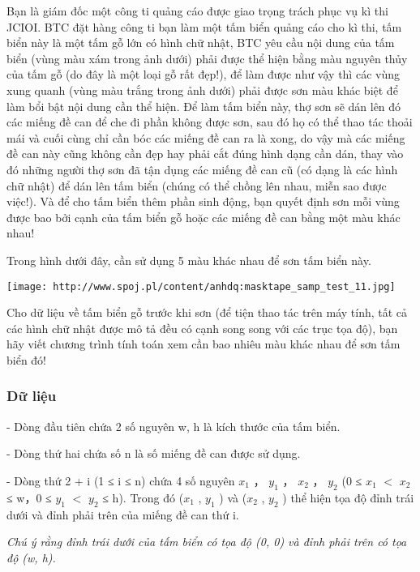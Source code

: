 



   Bạn là giám đốc một công ti quảng cáo được giao trọng trách phục vụ kì thi JCIOI. BTC đặt hàng công ti bạn làm một tấm biển quảng cáo cho kì thi, tấm biển này là một tấm gỗ lớn có hình chữ nhật, BTC yêu cầu nội dung của tấm biển (vùng màu xám trong ảnh dưới) phải được thể hiện bằng màu nguyên thủy của tấm gỗ (do đây là một loại gỗ rất đẹp!), để làm được như vậy thì các vùng xung quanh (vùng màu trắng trong ảnh dưới) phải được sơn màu khác biệt để làm bổi bật nội dung cần thể hiện. Để làm tấm biển này, thợ sơn sẽ dán lên đó các miếng đề can để che đi phần không được sơn, sau đó họ có thể thao tác thoải mái và cuối cùng chỉ cần bóc các miếng đề can ra là xong, do vậy mà các miếng đề can này cũng không cần đẹp hay phải cắt đúng hình dạng cần dán, thay vào đó những người thợ sơn đã tận dụng các miếng đề can cũ (có dạng là các hình chữ nhật) để dán lên tấm biển (chúng có thể chồng lên nhau, miễn sao được việc!). Và để cho tấm biển thêm phần sinh động, bạn quyết định sơn mỗi vùng được bao bởi cạnh của tấm biển gỗ hoặc các miếng đề can bằng một màu khác nhau!   


   Trong hình dưới đây, cần sử dụng 5 màu khác nhau để sơn tấm biển này.  


\texttt{[image: http://www.spoj.pl/content/anhdq:masktape\_samp\_test\_11.jpg]}



   Cho dữ liệu về tấm biển gỗ trước khi sơn (để tiện thao tác trên máy tính, tất cả các hình chữ nhật được mô tả đều có cạnh song song với các trục tọa độ), bạn hãy viết chương trình tính toán xem cần bao nhiêu màu khác nhau để sơn tấm biển đó!  

\subsubsection{   Dữ liệu  }

   - Dòng đầu tiên chứa 2 số nguyên w, h là kích thước của tấm biển.   


   - Dòng thứ hai chứa số n là số miếng đề can được sử dụng.   


   - Dòng thứ 2 + i (1 ≤ i ≤ n) chứa 4 số nguyên $x_{1}$   ， $y_{1}$   ， $x_{2}$   ， $y_{2}$   (0 ≤ $x_{1}$   $<$ $x_{2}$   ≤ w，0 ≤ $y_{1}$   $<$ $y_{2}$   ≤ h). Trong đó ($x_{1}$   , $y_{1}$   ) và ($x_{2}$   , $y_{2}$   ) thể hiện tọa độ đỉnh trái dưới và đỉnh phải trên của miếng đề can thứ i.   


\textit{     Chú ý rằng đỉnh trái dưới của tấm biển có tọa độ (0, 0) và đỉnh phải trên có tọa độ (w, h).    }

